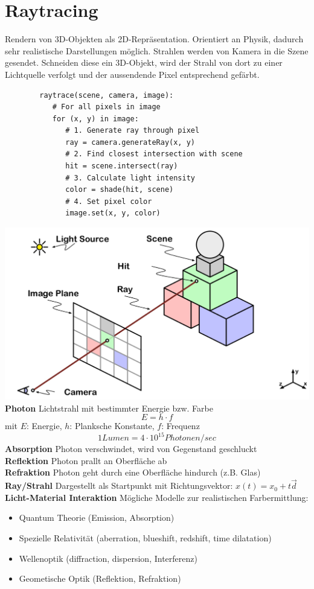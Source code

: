 \documentclass[12pt]{article}
\begin{document}
	\section{Raytracing}
	Rendern von 3D-Objekten als 2D-Repräsentation. Orientiert an Physik, dadurch sehr realistische Darstellungen möglich. Strahlen werden von Kamera in die Szene gesendet. Schneiden diese ein 3D-Objekt, wird der Strahl von dort zu einer Lichtquelle verfolgt und der aussendende Pixel entsprechend gefärbt.\\
	\begin{verbatim}
		raytrace(scene, camera, image):
		   # For all pixels in image
		   for (x, y) in image:
		      # 1. Generate ray through pixel
		      ray = camera.generateRay(x, y)
		      # 2. Find closest intersection with scene
		      hit = scene.intersect(ray)
		      # 3. Calculate light intensity
		      color = shade(hit, scene)
		      # 4. Set pixel color
		      image.set(x, y, color)		
	\end{verbatim}
	\includegraphics[width=\linewidth]{figures/raytracing.png}\\
	\textbf{Photon} Lichtstrahl mit bestimmter Energie bzw. Farbe
	$$E = h \cdot f$$
	mit $E$: Energie, $h$: Planksche Konstante, $f$: Frequenz
	$$1 Lumen = 4 \cdot 10^{15} Photonen/sec$$
	\textbf{Absorption} Photon verschwindet, wird von Gegenstand geschluckt\\
	\textbf{Reflektion} Photon prallt an Oberfläche ab\\
	\textbf{Refraktion} Photon geht durch eine Oberfläche hindurch (z.B. Glas)\\
	\textbf{Ray/Strahl} Dargestellt als Startpunkt mit Richtungsvektor: $x(t) = x_0 + t \vec{d}$
	\textbf{Licht-Material Interaktion} Mögliche Modelle zur realistischen Farbermittlung:
	\begin{itemize}
		\item Quantum Theorie (Emission, Absorption)
		\item Spezielle Relativität (aberration, blueshift, redshift, time dilatation)
		\item Wellenoptik (diffraction, dispersion, Interferenz)
		\item Geometische Optik (Reflektion, Refraktion)
	\end{itemize}
\end{document}
